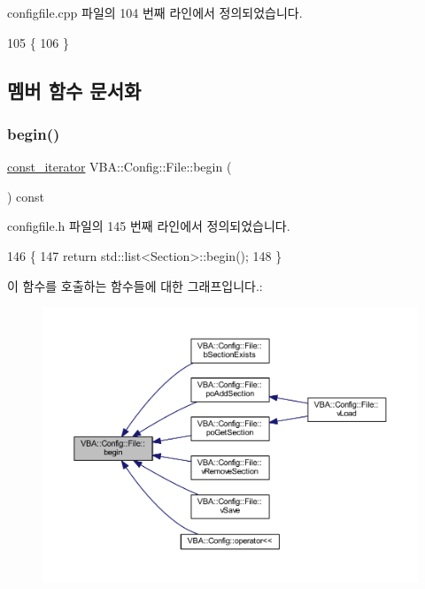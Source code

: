 configfile.\+cpp 파일의 104 번째 라인에서 정의되었습니다.


\begin{DoxyCode}
105 \{
106 \}
\end{DoxyCode}


\subsection{멤버 함수 문서화}
\mbox{\label{class_v_b_a_1_1_config_1_1_file_a4dd88e6aa71829ce332139028225efcf}} 
\subsubsection{\texorpdfstring{begin()}{begin()}}
{\footnotesize\ttfamily \mbox{\hyperlink{class_v_b_a_1_1_config_1_1_file_a3c4cd2c1e02bbe2dfff43c4e89c71edb}{const\+\_\+iterator}} V\+B\+A\+::\+Config\+::\+File\+::begin (\begin{DoxyParamCaption}{ }\end{DoxyParamCaption}) const\hspace{0.3cm}{\ttfamily [inline]}}



configfile.\+h 파일의 145 번째 라인에서 정의되었습니다.


\begin{DoxyCode}
146     \{
147       \textcolor{keywordflow}{return} std::list<Section>::begin();
148     \}
\end{DoxyCode}
이 함수를 호출하는 함수들에 대한 그래프입니다.\+:
\nopagebreak
\begin{figure}[H]
\begin{center}
\leavevmode
\includegraphics[width=350pt]{class_v_b_a_1_1_config_1_1_file_a4dd88e6aa71829ce332139028225efcf_icgraph}
\end{center}
\end{figure}
\mbox{\label{class_v_b_a_1_1_config_1_1_file_a1c449716812ae76ece9dd315a89da8ff}} 
